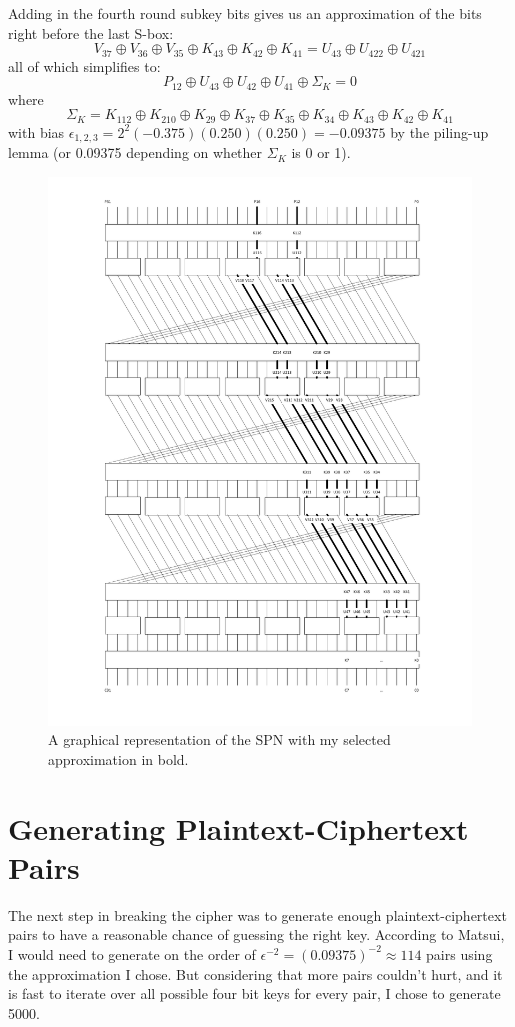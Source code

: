\documentclass{amsart}
\begin{document}
Adding in the fourth round subkey bits gives us an approximation of the bits right before the last S-box:
\[
V_{37}\oplus V_{36}\oplus V_{35}\oplus K_{43}\oplus K_{42}\oplus K_{41} = U_{43}\oplus U_{422}\oplus U_{421}
\]
all of which simplifies to:
\[
P_{12}\oplus U_{43}\oplus U_{42}\oplus U_{41}\oplus\Sigma_K = 0
\]
where
\[
\Sigma_K = K_{112} \oplus K_{210} \oplus K_{29} \oplus K_{37}\oplus K_{35}\oplus K_{34}\oplus K_{43}\oplus K_{42}\oplus K_{41}
\]
with bias $\epsilon_{1,2,3}=2^2(-0.375)(0.250)(0.250)=-0.09375$ by the piling-up lemma (or 0.09375 depending on whether $\Sigma_K$ is 0 or 1).

\begin{figure}[h]
\includegraphics[width=.9\textwidth]{spn.pdf}
\caption{A graphical representation of the SPN with my selected approximation in bold.}
\label{fig:spn}
\end{figure}

\section{Generating Plaintext-Ciphertext Pairs}
The next step in breaking the cipher was to generate enough plaintext-ciphertext pairs to have a reasonable chance of guessing the right key.  According to Matsui, I would need to generate on the order of $\epsilon^{-2}=(0.09375)^{-2}\approx 114$ pairs using the approximation I chose.  But considering that more pairs couldn't hurt, and it is fast to iterate over all possible four bit keys for every pair, I chose to generate 5000.
\end{document}
